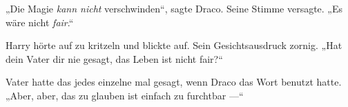 „Die Magie \emph{kann nicht} verschwinden“, sagte Draco. Seine Stimme versagte.
„Es wäre nicht \emph{fair}.“

Harry hörte auf zu kritzeln und blickte auf. Sein Gesichtsausdruck zornig.
„Hat dein Vater dir nie gesagt, das Leben ist nicht fair?“

Vater hatte das jedes einzelne mal gesagt, wenn Draco das Wort benutzt hatte.
„Aber, aber, das zu glauben ist einfach zu furchtbar —“

